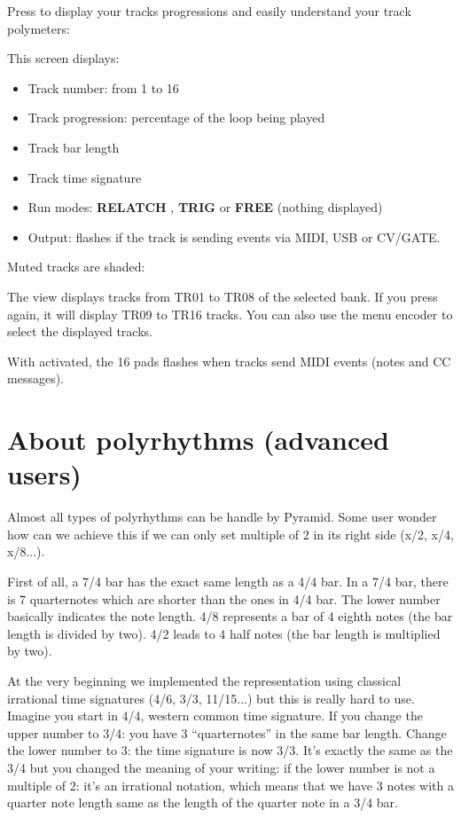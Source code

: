 Press  to display your tracks progressions and easily understand your track polymeters:


This screen displays:

\begin{itemize}
\item Track number: from 1 to 16
\item Track progression: percentage of the loop being played
\item Track bar length
\item Track time signature
\item Run modes: \textbf{RELATCH} , \textbf{TRIG}  or \textbf{FREE} (nothing displayed)
\item Output: flashes if the track is sending events via MIDI, USB or CV/GATE.
\end{itemize}

Muted tracks are shaded:


The  view displays tracks from TR01 to TR08 of the selected bank. If you press  again, it will display TR09 to TR16 tracks. You can also use the menu encoder to select the displayed tracks.

With  activated, the 16 pads flashes when tracks send MIDI events (notes and CC messages).


\section{About polyrhythms (advanced users)}

Almost all types of polyrhythms can be handle by Pyramid. Some user wonder how can we achieve this if we can only set multiple of 2 in its right side (x/2, x/4, x/8...).

First of all, a 7/4 bar has the exact same length as a 4/4 bar. In a 7/4 bar, there is 7 quarternotes which are shorter than the ones in 4/4 bar. The lower number basically indicates the note length. 4/8 represents a bar of 4 eighth notes (the bar length is divided by two). 4/2 leads to 4 half notes (the bar length is multiplied by two).

At the very beginning we implemented the representation using classical irrational time signatures (4/6, 3/3, 11/15...) but this is really hard to use. Imagine you start in 4/4, western common time signature. If you change the upper number to 3/4: you have 3 “quarternotes” in the same bar length. Change the lower number to 3: the time signature is now 3/3. It's exactly the same as the 3/4 but you changed the meaning of your writing: if the lower number is not a multiple of 2: it's an irrational notation, which means that we have 3 notes with a quarter note length same as the length of the quarter note in a 3/4 bar.

